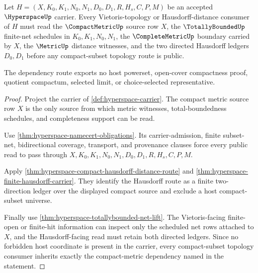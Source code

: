 \begin{theorem}
\label{thm:hyperspace-vietoris-compactmetric-dependency}
Let $H=(X,K_0,K_1,N_0,N_1,D_0,D_1,R,H_s,C,P,M)$ be an accepted $\HyperspaceUp$ carrier. Every Vietoris-topology or Hausdorff-distance consumer of $H$ must read the $\CompactMetricUp$ source row $X$, the $\TotallyBoundedUp$ finite-net schedules in $K_0,K_1,N_0,N_1$, the $\CompleteMetricUp$ boundary carried by $X$, the $\MetricUp$ distance witnesses, and the two directed Hausdorff ledgers $D_0,D_1$ before any compact-subset topology route is public.

The dependency route exports no host powerset, open-cover compactness proof, quotient compactum, selected limit, or choice-selected representative.
\end{theorem}
\begin{proof}
Project the carrier of \autoref{def:hyperspace-carrier}. The compact metric source row $X$ is the only source from which metric witnesses, total-boundedness schedules, and completeness support can be read.

Use \autoref{thm:hyperspace-namecert-obligations}. Its carrier-admission, finite subset-net, bidirectional coverage, transport, and provenance clauses force every public read to pass through $X,K_0,K_1,N_0,N_1,D_0,D_1,R,H_s,C,P,M$.

Apply \autoref{thm:hyperspace-compact-hausdorff-distance-route} and \autoref{thm:hyperspace-finite-hausdorff-carrier}. They identify the Hausdorff route as a finite two-direction ledger over the displayed compact source and exclude a host compact-subset universe.

Finally use \autoref{thm:hyperspace-totallybounded-net-lift}. The Vietoris-facing finite-open or finite-hit information can inspect only the scheduled net rows attached to $X$, and the Hausdorff-facing read must retain both directed ledgers. Since no forbidden host coordinate is present in the carrier, every compact-subset topology consumer inherits exactly the compact-metric dependency named in the statement.
\end{proof}

